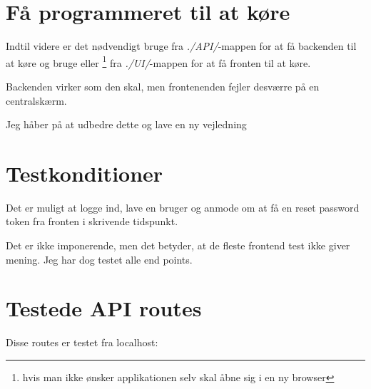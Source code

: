 \documentclass{report}
\begin{document}
\section{Få programmeret til at køre}

Indtil videre er det nødvendigt bruge  fra \textit{./API/}-mappen for at få backenden til at køre og bruge  eller \footnote{hvis man ikke ønsker applikationen selv skal åbne sig i en ny browser} fra \textit{./UI/}-mappen for at få fronten til at køre.\par{}
Backenden virker som den skal, men frontenenden fejler desværre på en centralskærm.\par{}

Jeg håber på at udbedre dette og lave en ny vejledning\par{}

\section{Testkonditioner}

Det er muligt at logge ind, lave en bruger og anmode om at få en reset password token fra fronten i skrivende tidspunkt.\par{}
Det er ikke imponerende, men det betyder, at de fleste frontend test ikke giver mening.
Jeg har dog testet alle end points.\par{}

\section{Testede API routes}

Disse routes er testet fra localhost:
\end{document}
